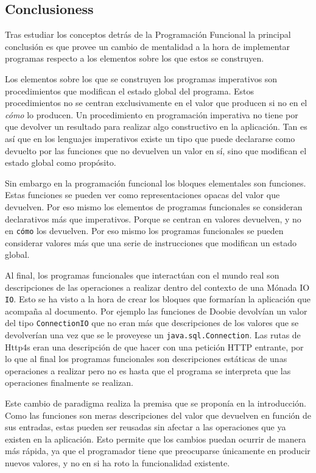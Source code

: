\documentclass[../main.tex]{subfiles}
\begin{document}
\subsection{Conclusioness}
Tras estudiar los conceptos detrás de la Programación Funcional la principal
conclusión es que provee un cambio de mentalidad a la hora de implementar programas
respecto a los elementos sobre los que estos se construyen.

Los elementos sobre los que se construyen los programas imperativos son procedimientos
que modifican el estado global del programa. Estos procedimientos no se centran exclusivamente
en el valor que producen si no en el \textit{cómo} lo producen. Un procedimiento en programación
imperativa no tiene por que devolver un resultado para realizar algo constructivo en la aplicación.
Tan es así que en los lenguajes imperativos existe un tipo  que puede declararse
como devuelto por las funciones que no devuelven un valor en sí, sino que modifican el estado global
como propósito.

Sin embargo en la programación funcional los bloques elementales son funciones. Estas
funciones se pueden ver como representaciones opacas del valor que devuelven. Por eso
mismo los elementos de programas funcionales se consideran declarativos más que imperativos.
Porque se centran en  valores devuelven, y no en \texttt{cómo} los devuelven.
Por eso mismo los programas funcionales se pueden considerar valores más que una serie de
instrucciones que modifican un estado global.

Al final, los programas funcionales que interactúan con el mundo real son descripciones de
las operaciones a realizar dentro del contexto de una Mónada IO \texttt{IO}. Esto se ha visto
a la hora de crear los bloques que formarían la aplicación que acompaña al documento. Por ejemplo
las funciones de Doobie devolvían un valor del tipo \texttt{ConnectionIO} que no eran más que
descripciones de los valores que se devolverían una vez que se le proveyese un \texttt{java.sql.Connection}.
Las rutas de Http4s eran una descripción de que hacer con una petición HTTP entrante, por lo que al
final los programas funcionales son descripciones estáticas de unas operaciones a realizar pero
no es hasta que el programa se interpreta que las operaciones finalmente se realizan.

Este cambio de paradigma realiza la premisa que se proponía en la introducción. Como las
funciones son meras descripciones del valor que devuelven en función de sus entradas, estas
pueden ser reusadas sin afectar a las operaciones que ya existen en la aplicación. Esto permite
que los cambios puedan ocurrir de manera más rápida, ya que el programador tiene que preocuparse
únicamente en producir nuevos valores, y no en si ha roto la funcionalidad existente.
\end{document}

